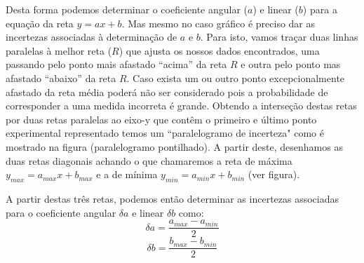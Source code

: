 Desta forma podemos determinar o coeficiente angular ($a$) e linear ($b$) para a equação da reta $y = ax + b$.  Mas mesmo no caso gráfico é preciso dar as incertezas associadas à determinação de $a$ e $b$.  Para isto, vamos traçar duas linhas paralelas à melhor reta ($R$) que ajusta os nossos dados encontrados, uma passando pelo ponto mais afastado ``acima'' da reta $R$ e outra pelo ponto mas afastado ``abaixo'' da reta $R$. %
Caso exista um ou outro ponto excepcionalmente afastado da reta média poderá não ser considerado pois a probabilidade de corresponder a uma medida incorreta é grande. Obtendo a interseção destas retas por duas retas paralelas ao eixo-y que contêm o primeiro e último ponto experimental representado temos um ``paralelogramo de incerteza" como é mostrado na figura (paralelogramo pontilhado). A partir deste, desenhamos as duas retas diagonais achando o que chamaremos a reta de máxima $y_{max} = a_{max} x + b_{max}$ e a de mínima $y_{min} = a_{min} x + b_{min}$ (ver figura).

A partir destas três retas, podemos então determinar as incertezas associadas para o coeficiente angular $\delta a$ e linear $\delta b$ como:
\[
\delta a = \frac{a_{max} - a_{min}}{2} 
\]
\[
\delta b = \frac{b_{max} - b_{min}}{2}
\]